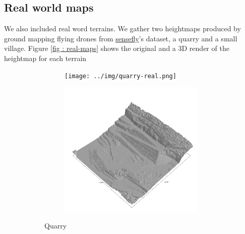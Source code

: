 \documentclass[../document.tex]{subfiles}
\begin{document}
\subsection{Real world maps}
We also included real word terrains. We gather two heightmaps produced by ground mapping flying drones from \href{https://www.sensefly.com/education/datasets/}{sensefly}'s dataset, a quarry and a small village. Figure \ref{fig : real-maps} shows the original and a 3D render of the heightmap for each terrain
\begin{figure}[htbp]
    \centering
    \begin{subfigure}[b]{1\textwidth}
    \begin{subfigure}[b]{0.45\textwidth}
        \texttt{[image: ../img/quarry-real.png]}
    \end{subfigure}
    \begin{subfigure}[b]{0.45\textwidth}
        \includegraphics[width=\textwidth]{../img/hm3d_borders/querry-big-10.png}
    \end{subfigure}
    \caption{Quarry}
    \label{fig : real-maps-quarry}
\end{subfigure}
\begin{subfigure}[b]{1\textwidth}
    \begin{subfigure}[b]{0.45\textwidth}

\end{subfigure}
\end{subfigure}
\end{figure}
\end{document}
